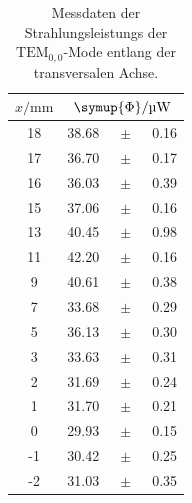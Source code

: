 \FloatBarrier
\begin{table}[h]
    \centering
    \caption{Messdaten der Strahlungsleistungs der $\text{TEM}_{0,0}$-Mode entlang der transversalen Achse.}
    \label{tab:atab3}
    \begin{tabular}{S[table-format=2.0]  S[table-format=2.2] @{}c @{}S[table-format=1.2]}
        \toprule
        {$x/\si{\mm}$} & \\
        \midrule
        18 & 38.68 &{$\;\pm\;$}& 0.16 \\
        17 & 36.70 &{$\;\pm\;$}& 0.17 \\
        16 & 36.03 &{$\;\pm\;$}& 0.39 \\
        15 & 37.06 &{$\;\pm\;$}& 0.16 \\
        13 & 40.45 &{$\;\pm\;$}& 0.98 \\
        11 & 42.20 &{$\;\pm\;$}& 0.16 \\
        9  & 40.61 &{$\;\pm\;$}& 0.38 \\
        7  & 33.68 &{$\;\pm\;$}& 0.29 \\
        5  & 36.13 &{$\;\pm\;$}& 0.30 \\
        3  & 33.63 &{$\;\pm\;$}& 0.31 \\
        2  & 31.69 &{$\;\pm\;$}& 0.24 \\
        1  & 31.70 &{$\;\pm\;$}& 0.21 \\
        0  & 29.93 &{$\;\pm\;$}& 0.15 \\
        -1 & 30.42 &{$\;\pm\;$}& 0.25 \\
        -2 & 31.03 &{$\;\pm\;$}& 0.35 \\
        \bottomrule
    \end{tabular}
\end{table}
\FloatBarrier
\noindent

